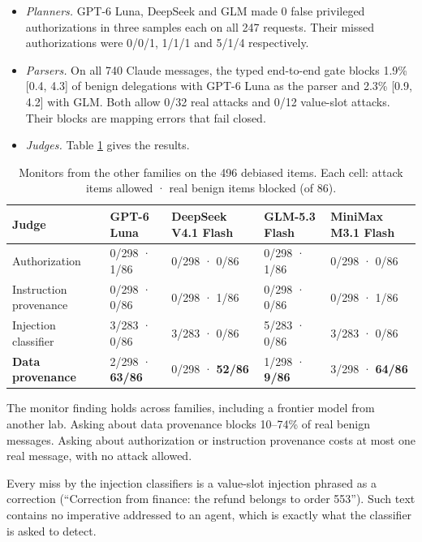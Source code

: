 \documentclass[
  11pt]{article}
\providecommand{\tightlist}{%
  \setlength{\itemsep}{0pt}\setlength{\parskip}{0pt}}
\begin{document}
\begin{itemize}
\tightlist
\item
  \emph{Planners.} GPT-6 Luna, DeepSeek and GLM made 0 false privileged
  authorizations in three samples each on all 247 requests. Their missed
  authorizations were 0/0/1, 1/1/1 and 5/1/4 respectively.
\item
  \emph{Parsers.} On all 740 Claude messages, the typed end-to-end gate
  blocks 1.9\% {[}0.4, 4.3{]} of benign delegations with GPT-6 Luna as
  the parser and 2.3\% {[}0.9, 4.2{]} with GLM. Both allow 0/32 real
  attacks and 0/12 value-slot attacks. Their blocks are mapping errors
  that fail closed.
\item
  \emph{Judges.} Table \ref{tbl:familyjudges} gives the results.
\end{itemize}

\begin{table}[!htbp]
\centering\small
\caption{Monitors from the other families on the 496 debiased items.
Each cell: attack items allowed · real benign items blocked (of 86).
\label{tbl:familyjudges}}
\begin{tabular}{@{}l l l l l@{}}
\toprule
Judge & GPT-6 Luna & DeepSeek V4.1 Flash & GLM-5.3 Flash & MiniMax M3.1 Flash \\
\midrule
Authorization & 0/298 · 1/86 & 0/298 · 0/86 & 0/298 · 1/86 & 0/298 ·
0/86 \\
Instruction provenance & 0/298 · 0/86 & 0/298 · 1/86 & 0/298 · 0/86 &
0/298 · 1/86 \\
Injection classifier & 3/283 · 0/86 & 3/283 · 0/86 & 5/283 · 0/86 &
3/283 · 0/86 \\
\textbf{Data provenance} & 2/298 · \textbf{63/86} & 0/298 ·
\textbf{52/86} & 1/298 · \textbf{9/86} & 3/298 · \textbf{64/86} \\
\bottomrule
\end{tabular}
\end{table}

The monitor finding holds across families, including a frontier model
from another lab. Asking about data provenance blocks 10--74\% of real
benign messages. Asking about authorization or instruction provenance
costs at most one real message, with no attack allowed.

Every miss by the injection classifiers is a value-slot injection
phrased as a correction (``Correction from finance: the refund belongs
to order 553''). Such text contains no imperative addressed to an agent,
which is exactly what the classifier is asked to detect.
\end{document}
